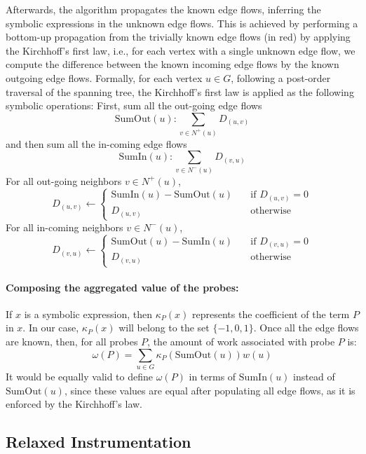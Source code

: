 Afterwards, the algorithm propagates the known edge flows, inferring
the symbolic expressions in the unknown edge flows.
This is achieved by performing a bottom-up propagation from the trivially known
edge flows (in red) by applying the Kirchhoff's first law, i.e.,
for each vertex with a single unknown edge flow, we compute the difference between
the known incoming edge flows by the known outgoing edge flows.
Formally,
for each vertex $u\in G$, following a post-order traversal of the spanning tree,
the Kirchhoff's first law is applied as the following symbolic operations:
First, sum all the out-going edge flows
\[
\mathrm{SumOut}(u): \sum_{v\in N^+(u)} D_{(u,v)}
\]
and then sum all the in-coming edge flows
\[
\mathrm{SumIn}(u): \sum_{v\in N^-(u)} D_{(v,u)}
\]
For all out-going neighbors $v\in N^+(u)$,
\[
D_{(u,v)} \gets
\begin{cases}
    \mathrm{SumIn}(u) - \mathrm{SumOut}(u) & \!\!\!\quad \text{if $D_{(u,v)} = 0$}\\
    D_{(u,v)}       & \!\!\!\quad \text{otherwise}
\end{cases}
\]
For all in-coming neighbors $v\in N^-(u)$,
\[
D_{(v,u)} \gets
\begin{cases}
    \mathrm{SumOut}(u) - \mathrm{SumIn}(u) & \!\!\!\quad \text{if $D_{(v,u)} = 0$}\\
    D_{(v,u)}  & \!\!\!\quad \text{otherwise}
\end{cases}
\]

\paragraph{Composing the aggregated value of the probes:}
If $x$ is a symbolic expression, then $\kappa_P(x)$ represents the coefficient
of the term $P$ in $x$.
In our case, $\kappa_P(x)$ will belong to the set $\{-1,0,1\}$.
Once all the edge flows are known, then,
for all probes $P$, the amount of work associated
with probe $P$ is:
\[
\omega(P) = \sum_{u\in G} \kappa_P(\mathrm{SumOut}(u))w(u)
\]
It would be equally valid to define $\omega(P)$ in terms of $\mathrm{SumIn}(u)$
instead of $\mathrm{SumOut}(u)$,
since these values are equal after populating all edge flows,
as it is enforced by the Kirchhoff's law.

\subsection{Relaxed Instrumentation}


